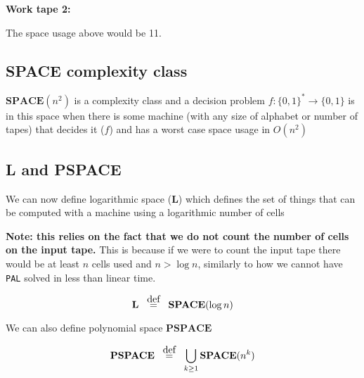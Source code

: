\documentclass{article}
\newcommand{\defeq}{\stackrel{\mathclap{\normalfont\mbox{def}}}{=}}
\begin{document}
  \textbf{Work tape 2:}
  \begin{center}



  \end{center}

  The space usage above would be 11.

  \subsection{\textbf{SPACE} complexity class}

  $\mathbf{SPACE} (n^{2})$ is a complexity class and a decision problem $f: \{ 0,1 \}^{*} \rightarrow \{ 0,1 \}  $ is in this space when there is some machine (with any size of alphabet or number of tapes) that decides it ($f$) and has a worst case space usage in $O(n^{2})$


  \subsection{\textbf{L} and \textbf{PSPACE} }

  We can now define logarithmic space ($\mathbf{L} $) which defines the set of things that can be computed with a machine using a logarithmic number of cells

  \textbf{Note: this relies on the fact that we do not count the number of cells on the input tape.} This is because if we were to count the input tape there would be at least $n$ cells used and $n > \log n$, similarly to how we cannot have \texttt{PAL} solved in less than linear time.

  \[
    \mathbf{L}  \;\;\; \defeq  \;\;\; \mathbf{SPACE}(\log n)
  \]

  We can also define polynomial space $\mathbf{PSPACE} $

  \[
    \mathbf{PSPACE} \;\;\; \defeq \;\;\; \bigcup_{k\geq1} \mathbf{SPACE} (n^{k})
  \]
\end{document}
